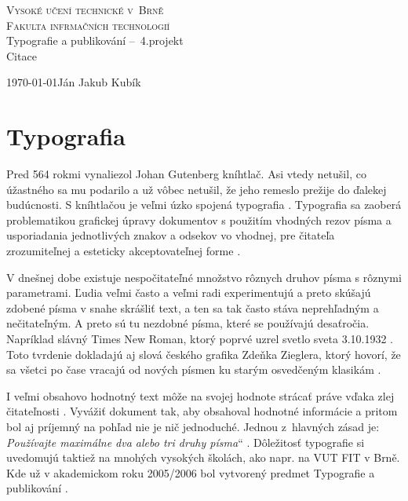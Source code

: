 \documentclass[a4paper, 11pt, times]{article}
\providecommand{\uv}[1]{\quotedblbase #1\textquotedblleft}
\begin{document}
\begin{titlepage}
\begin{center}
  \Huge\textsc{Vysoké učení technické v~Brně} \\
      \huge\textsc{Fakulta infrmačních technologií}\\
  \huge Typografie a publikování \---\ 4.projekt\\
  \Huge{Citace}
\end{center}

{\LARGE \today \hfill Ján Jakub Kubík}
\end{titlepage}


\section*{Typografia}
Pred 564 rokmi vynaliezol Johan Gutenberg kníhtlač. Asi vtedy netušil, co úžastného sa mu podarilo
a už vôbec netušil, že jeho remeslo prežije do ďalekej budúcnosti. S kníhtlačou je veľmi úzko
spojená typografia \citep{Javorek:2008}. Typografia sa zaoberá problematikou grafickej úpravy
dokumentov s použitím vhodných rezov písma a usporiadania jednotlivých znakov a odsekov vo vhodnej,
pre čitateľa zrozumiteľnej a esteticky akceptovateľnej forme \citep{Wikipedia:2017}.

V dnešnej dobe existuje nespočitateľné množstvo rôznych druhov písma s rôznymi parametrami.
Ľudia veľmi často a veľmi radi experimentujú a preto skúšajú zdobené písma v snahe skrášliť
text, a ten sa tak často stáva neprehľadným a nečitateľným.
A preto sú tu nezdobné písma, které se používajú desaťročia. Napríklad slávný Times New Roman, ktorý
poprvé uzrel svetlo sveta 3.10.1932 \citep{Tholenaar:2010}. %
Toto tvrdenie dokladajú aj slová českého grafika Zdeňka Zieglera, ktorý hovorí,
že sa všetci po čase vracajú od nových písmen ku starým osvedčeným klasikám \citep{Krc:2012}.

I veľmi obsahovo hodnotný text môže na svojej hodnote strácať práve vďaka zlej čitateľnosti
\citep{Bringhurst:The_elements_of_typhographis_style}.
Vyvážiť dokument tak, aby obsahoval hodnotné informácie a pritom bol aj príjemný na pohľad
nie je nič jednoduché. Jednou z~hlavných zásad je: \uv{\emph{Používajte maximálne dva alebo
tri druhy písma}} \citep{samara:2008}. Dôležitosť typografie si uvedomujú taktiež na
mnohých vysokých školách, ako napr. na VUT FIT v Brně. Kde už v akademickom roku 2005/2006 bol
vytvorený predmet Typografie a publikování \citep{VUT}.
\end{document}
